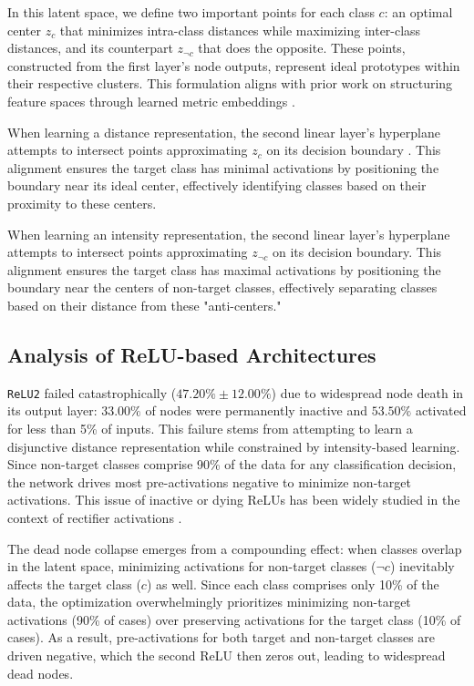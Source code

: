 In this latent space, we define two important points for each class $c$: an optimal center $z_c$ that minimizes intra-class distances while maximizing inter-class distances, and its counterpart $z_{\neg c}$ that does the opposite. These points, constructed from the first layer's node outputs, represent ideal prototypes within their respective clusters. This formulation aligns with prior work on structuring feature spaces through learned metric embeddings \cite{weinberger2009distance, xing2002distance}.

When learning a distance representation, the second linear layer's hyperplane attempts to intersect points approximating $z_c$ on its decision boundary \cite{oursland2024interpreting}. This alignment ensures the target class has minimal activations by positioning the boundary near its ideal center, effectively identifying classes based on their proximity to these centers. 

When learning an intensity representation, the second linear layer's hyperplane attempts to intersect points approximating $z_{\neg c}$ on its decision boundary. This alignment ensures the target class has maximal activations by positioning the boundary near the centers of non-target classes, effectively separating classes based on their distance from these "anti-centers."

\subsection{Analysis of ReLU-based Architectures}

\texttt{ReLU2} failed catastrophically ($47.20\% \pm 12.00\%$) due to widespread node death in its output layer: $33.00\%$ of nodes were permanently inactive and $53.50\%$ activated for less than 5\% of inputs. This failure stems from attempting to learn a disjunctive distance representation while constrained by intensity-based learning. Since non-target classes comprise 90\% of the data for any classification decision, the network drives most pre-activations negative to minimize non-target activations. This issue of inactive or dying ReLUs has been widely studied in the context of rectifier activations \cite{he2015delving}.

The dead node collapse emerges from a compounding effect: when classes overlap in the latent space, minimizing activations for non-target classes ($\neg c$) inevitably affects the target class ($c$) as well. Since each class comprises only 10\% of the data, the optimization overwhelmingly prioritizes minimizing non-target activations (90\% of cases) over preserving activations for the target class (10\% of cases). As a result, pre-activations for both target and non-target classes are driven negative, which the second ReLU then zeros out, leading to widespread dead nodes.

